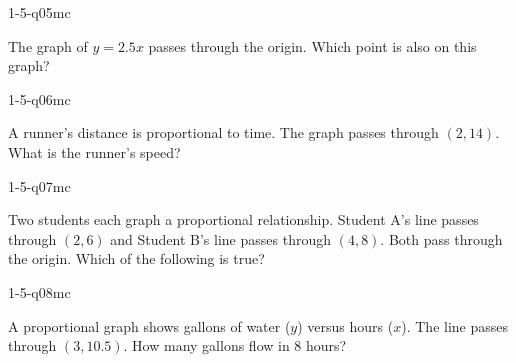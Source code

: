 \begin{practiceQuestion}{1-5-q05}{mc}
\begin{questionText}
The graph of $y = 2.5x$ passes through the origin. Which point is also on this graph?
\end{questionText}
\end{practiceQuestion}

\begin{practiceQuestion}{1-5-q06}{mc}
\begin{questionText}
A runner's distance is proportional to time. The graph passes through $(2, 14)$. What is the runner's speed?
\end{questionText}
\end{practiceQuestion}

\begin{practiceQuestion}{1-5-q07}{mc}
\begin{questionText}
Two students each graph a proportional relationship. Student A's line passes through $(2, 6)$ and Student B's line passes through $(4, 8)$. Both pass through the origin. Which of the following is true?
\end{questionText}
\end{practiceQuestion}

\begin{practiceQuestion}{1-5-q08}{mc}
\begin{questionText}
A proportional graph shows gallons of water ($y$) versus hours ($x$). The line passes through $(3, 10.5)$. How many gallons flow in $8$ hours?
\end{questionText}
\end{practiceQuestion}

